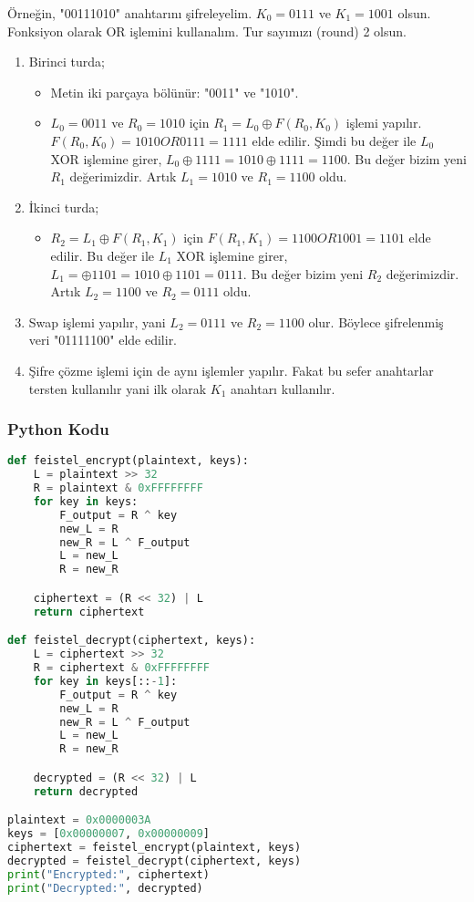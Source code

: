 Örneğin, "00111010" anahtarını şifreleyelim. $K_0 = 0111$ ve $K_1 = 1001$ olsun. Fonksiyon olarak OR işlemini kullanalım. Tur sayımızı (round) 2 olsun.

\begin{enumerate}
    \item Birinci turda;
    \begin{itemize}
        \item Metin iki parçaya bölünür: "0011" ve "1010".
        \item $L_0 = 0011$ ve $R_0 = 1010$ için $R_1 = L_0 \oplus F(R_0, K_0)$ işlemi yapılır. $F(R_0, K_0) = 1010 OR 0111 = 1111$ elde edilir. Şimdi bu değer ile $L_0$ XOR işlemine girer, $L_0 \oplus 1111 = 1010 \oplus 1111 = 1100$. Bu değer bizim yeni $R_1$ değerimizdir. Artık $L_1 = 1010$ ve $R_1 = 1100$ oldu. 
    \end{itemize}
    \item İkinci turda;
    \begin{itemize}
        \item $R_2 = L_1 \oplus F(R_1, K_1)$ için $F(R_1, K_1) = 1100 OR 1001 = 1101$ elde edilir. Bu değer ile $L_1$ XOR işlemine girer, $L_1 = \oplus 1101 = 1010 \oplus 1101 = 0111$. Bu değer bizim yeni $R_2$ değerimizdir. Artık $L_2 = 1100$ ve $R_2 = 0111$ oldu. 
    \end{itemize}
    \item Swap işlemi yapılır, yani $L_2 = 0111$ ve $R_2 = 1100$ olur. Böylece şifrelenmiş veri "01111100" elde edilir.
    \item Şifre çözme işlemi için de aynı işlemler yapılır. Fakat bu sefer anahtarlar tersten kullanılır yani ilk olarak $K_1$ anahtarı kullanılır.
\end{enumerate}

\subsubsection{Python Kodu}

\begin{lstlisting}[language=Python]
def feistel_encrypt(plaintext, keys):
    L = plaintext >> 32
    R = plaintext & 0xFFFFFFFF
    for key in keys:
        F_output = R ^ key
        new_L = R
        new_R = L ^ F_output
        L = new_L
        R = new_R

    ciphertext = (R << 32) | L
    return ciphertext

def feistel_decrypt(ciphertext, keys):
    L = ciphertext >> 32
    R = ciphertext & 0xFFFFFFFF
    for key in keys[::-1]:
        F_output = R ^ key
        new_L = R
        new_R = L ^ F_output
        L = new_L
        R = new_R

    decrypted = (R << 32) | L
    return decrypted

plaintext = 0x0000003A
keys = [0x00000007, 0x00000009]
ciphertext = feistel_encrypt(plaintext, keys)
decrypted = feistel_decrypt(ciphertext, keys)
print("Encrypted:", ciphertext)
print("Decrypted:", decrypted)
\end{lstlisting}

